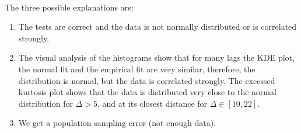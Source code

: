             \
            
            \noindent The three possible explanations are:
            \begin{enumerate}
                \item The tests are correct and the data is not normally distributed or is correlated strongly.
                \item The visual analysis of the histograms show that for many lags the KDE plot, the normal fit and 
                the empirical fit are very similar, therefore, the distribution is normal, but the data is 
                correlated strongly. The excessed kurtosis plot shows that the data is distributed very close to the normal
                distribution for $\Delta > 5$, and at its closest distance for $\Delta \in [10, 22]$.
                \item We get a population sampling error (not enough data).
            \end{enumerate} 